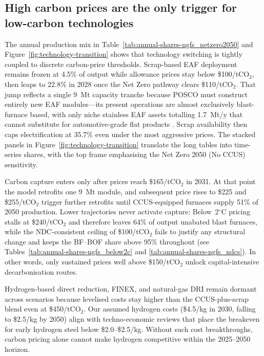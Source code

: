 \documentclass[preprint,1p,authoryear]{elsarticle}
\begin{document}
\subsection{High carbon prices are the only trigger for low-carbon technologies}

The annual production mix in Table~\ref{tab:annual-shares-ngfs_netzero2050} and Figure~\ref{fig:technology-transition} shows that technology switching is tightly coupled to discrete carbon-price thresholds. Scrap-based EAF deployment remains frozen at 4.5\% of output while allowance prices stay below \$100/tCO$_2$, then leaps to 22.8\% in 2028 once the Net Zero pathway clears \$110/tCO$_2$. That jump reflects a single 9~Mt capacity tranche because POSCO must construct entirely new EAF modules—its present operations are almost exclusively blast-furnace based, with only niche stainless EAF assets totalling 1.7~Mt/y that cannot substitute for automotive-grade flat products \citep{POSCO2023SR}. Scrap availability then caps electrification at 35.7\% even under the most aggressive prices. The stacked panels in Figure~\ref{fig:technology-transition} translate the long tables into time-series shares, with the top frame emphasising the Net Zero 2050 (No CCUS) sensitivity.

Carbon capture enters only after prices reach \$165/tCO$_2$ in 2031. At that point the model retrofits one 9~Mt module, and subsequent price rises to \$225 and \$255/tCO$_2$ trigger further retrofits until CCUS-equipped furnaces supply 51\% of 2050 production. Lower trajectories never activate capture: Below~2$^\circ$C pricing stalls at \$240/tCO$_2$ and therefore leaves 64\% of output unabated blast furnaces, while the NDC-consistent ceiling of \$100/tCO$_2$ fails to justify any structural change and keeps the BF--BOF share above 95\% throughout (see Tables~\ref{tab:annual-shares-ngfs_below2c} and \ref{tab:annual-shares-ngfs_ndcs}). In other words, only sustained prices well above \$150/tCO$_2$ unlock capital-intensive decarbonisation routes.

Hydrogen-based direct reduction, FINEX, and natural-gas DRI remain dormant across scenarios because levelised costs stay higher than the CCUS-plus-scrap blend even at \$450/tCO$_2$. Our assumed hydrogen costs (\$4.5/kg in 2030, falling to \$2.5/kg by 2050) align with techno-economic reviews \citep{MaterialEconomics2019,demailly2018european} that place the breakeven for early hydrogen steel below \$2.0--\$2.5/kg. Without such cost breakthroughs, carbon pricing alone cannot make hydrogen competitive within the 2025--2050 horizon.
\end{document}
